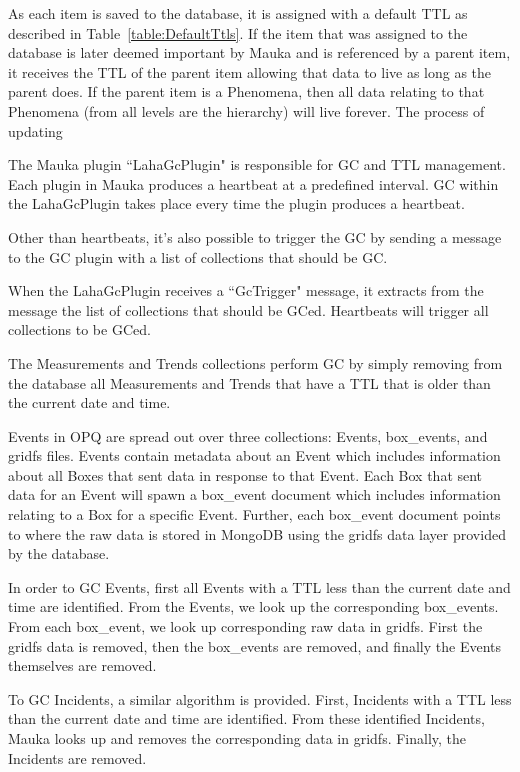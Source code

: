 As each item is saved to the database, it is assigned with a default TTL as described in Table~\ref{table:DefaultTtls}. If the item that was assigned to the database is later deemed important by Mauka and is referenced by a parent item, it receives the TTL of the parent item allowing that data to live as long as the parent does. If the parent item is a Phenomena, then all data relating to that Phenomena (from all levels are the hierarchy) will live forever. The process of updating

The Mauka plugin ``LahaGcPlugin" is responsible for GC and TTL management. Each plugin in Mauka produces a heartbeat at a predefined interval. GC within the LahaGcPlugin takes place every time the plugin produces a heartbeat.

Other than heartbeats, it's also possible to trigger the GC by sending a message to the GC plugin with a list of collections that should be GC\@.

When the LahaGcPlugin receives a ``GcTrigger" message, it extracts from the message the list of collections that should be GCed. Heartbeats will trigger all collections to be GCed.

The Measurements and Trends collections perform GC by simply removing from the database all Measurements and Trends that have a TTL that is older than the current date and time.

Events in OPQ are spread out over three collections: Events, box\_events, and gridfs files. Events contain metadata about an Event which includes information about all Boxes that sent data in response to that Event. Each Box that sent data for an Event will spawn a box\_event document which includes information relating to a Box for a specific Event. Further, each box\_event document points to where the raw data is stored in MongoDB using the gridfs data layer provided by the database.

In order to GC Events, first all Events with a TTL less than the current date and time are identified. From the Events, we look up the corresponding box\_events. From each box\_event, we look up corresponding raw data in gridfs. First the gridfs data is removed, then the box\_events are removed, and finally the Events themselves are removed.

To GC Incidents, a similar algorithm is provided. First, Incidents with a TTL less than the current date and time are identified. From these identified Incidents, Mauka looks up and removes the corresponding data in gridfs. Finally, the Incidents are removed.

